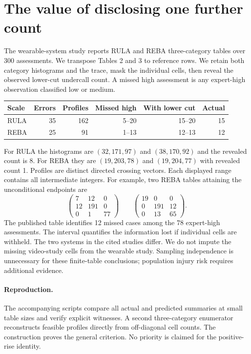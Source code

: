 \documentclass[11pt]{article}
\begin{document}
\section{The value of disclosing one further count}
The wearable-system study \cite{huang} reports RULA and REBA three-category tables over 300 assessments. We transpose Tables 2 and 3 to reference rows. We retain both category histograms and the trace, mask the individual cells, then reveal the observed lower-cut undercall count. A missed high assessment is any expert-high observation classified low or medium.
\begin{center}
\begin{tabular}{lrrrrr}
\toprule
Scale & Errors & Profiles & Missed high & With lower cut & Actual\\
\midrule
RULA & 35 & 162 & 5--20 & 15--20 & 15\\
REBA & 25 & 91  & 1--13 & 12--13 & 12\\
\bottomrule
\end{tabular}
\end{center}
For RULA the histograms are $(32,171,97)$ and $(38,170,92)$ and the revealed count is 8. For REBA they are $(19,203,78)$ and $(19,204,77)$ with revealed count 1. Profiles are distinct directed crossing vectors. Each displayed range contains all intermediate integers. For example, two REBA tables attaining the unconditional endpoints are
\[
 \begin{pmatrix}7&12&0\\12&191&0\\0&1&77\end{pmatrix}
 \qquad
 \begin{pmatrix}19&0&0\\0&191&12\\0&13&65\end{pmatrix}.
\]
The published table identifies 12 missed cases among the 78 expert-high assessments. The interval quantifies the information lost if individual cells are withheld. The two systems in the cited studies differ. We do not impute the missing video-study cells from the wearable study. Sampling independence is unnecessary for these finite-table conclusions; population injury risk requires additional evidence.

\paragraph{Reproduction.} The accompanying scripts compare all actual and predicted summaries at small table sizes and verify explicit witnesses. A second three-category enumerator reconstructs feasible profiles directly from off-diagonal cell counts. The construction proves the general criterion. No priority is claimed for the positive-rise identity.
\end{document}
